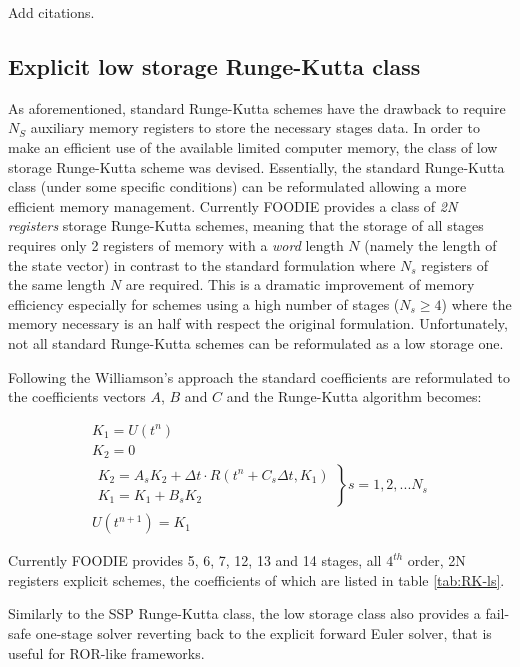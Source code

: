 {\color{red} Add citations.}

\subsection{Explicit low storage Runge-Kutta class}

As aforementioned, standard Runge-Kutta schemes have the drawback to require $N_S$ auxiliary memory registers to store the necessary stages data. In order to make an efficient use of the available limited computer memory, the class of low storage Runge-Kutta scheme was devised. Essentially, the standard Runge-Kutta class (under some specific conditions) can be reformulated allowing a more efficient memory management. Currently FOODIE provides a class of \emph{2N registers} storage Runge-Kutta schemes, meaning that the storage of all stages requires only 2 registers of memory with a \emph{word} length $N$ (namely the length of the state vector) in contrast to the standard formulation where $N_s$ registers of the same length $N$ are required. This is a dramatic improvement of memory efficiency especially for schemes using a high number of stages ($N_s \ge 4$) where the memory necessary is an half with respect the original formulation. Unfortunately, not all standard Runge-Kutta schemes can be reformulated as a low storage one.

Following the Williamson's approach the standard coefficients are reformulated to the coefficients vectors $A$, $B$ and $C$ and the Runge-Kutta algorithm becomes:

\begin{equation}
\begin{matrix}
  K_1 = U\left(t^n\right) \\
  K_2 = 0 \\
  \left.\begin{matrix}
    K_2 = A_s K_2 + \Delta t \cdot R\left(t^n + C_s \Delta t, K_1\right) \\
    K_1 = K_1 + B_s K_2
  \end{matrix}\right\} s=1,2,...N_s\\
  U\left(t^{n+1}\right) = K_1
  \end{matrix}
\label{eq:RK-ls}
\end{equation}

Currently FOODIE provides 5, 6, 7, 12, 13 and 14 stages, all $4^{th}$ order, 2N registers explicit schemes, the coefficients of which are listed in table \ref{tab:RK-ls}.

Similarly to the SSP Runge-Kutta class, the low storage class also provides a fail-safe one-stage solver reverting back to the explicit forward Euler solver, that is useful for ROR-like frameworks.

